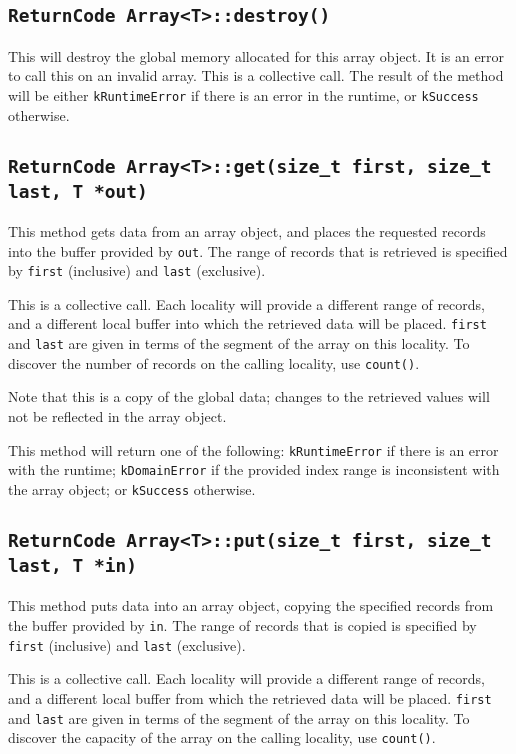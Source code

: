 \documentclass[11pt]{book}
\begin{document}
\subsection{{\tt ReturnCode Array<T>::destroy()}}

This will destroy the global memory allocated for this array object. It is
an error to call this on an invalid array. This is a collective call. The
result of the method will be either {\tt kRuntimeError} if there is an error
in the runtime, or {\tt kSuccess} otherwise.

\subsection{{\tt ReturnCode Array<T>::get(size\_t first, size\_t last, T *out)}}
This method gets data from an array object, and places the requested
records into the buffer provided by {\tt out}. The range of records that is
retrieved is specified by {\tt first} (inclusive) and {\tt last} (exclusive).

This is a collective call. Each locality will provide a different range of
records, and a different local buffer into which the retrieved data will be
placed. {\tt first} and {\tt last} are given in terms of the segment of the
array on this locality. To discover the number of records on the calling
locality, use {\tt count()}. 

Note that this is a copy of the global data; changes to the retrieved values
will not be reflected in the array object.

This method will return one of the following: {\tt kRuntimeError} if there is an
error with the runtime; {\tt kDomainError} if the provided index range is
inconsistent with the array object; or {\tt kSuccess} otherwise.

\subsection{{\tt ReturnCode Array<T>::put(size\_t first, size\_t last, T *in)}}

This method puts data into an array object, copying the specified
records from the buffer provided by {\tt in}. The range of records that is
copied is specified by {\tt first} (inclusive) and {\tt last} (exclusive).

This is a collective call. Each locality will provide a different range of
records, and a different local buffer from which the retrieved data will be
placed. {\tt first} and {\tt last} are given in terms of the segment of the
array on this locality. To discover the capacity of the array on the calling
locality, use {\tt count()}.
\end{document}
